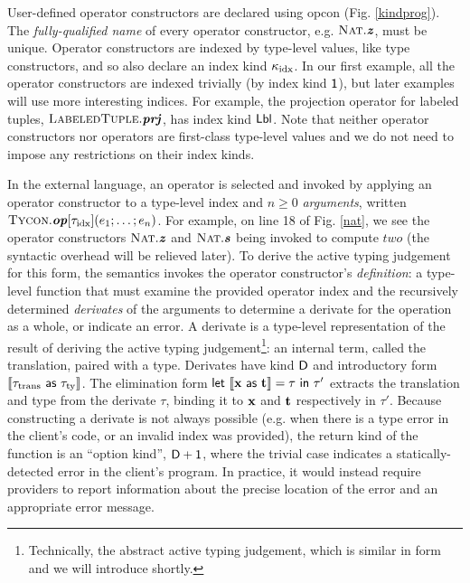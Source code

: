 \documentclass[9pt,preprint]{sigplanconf}
\begin{document}
User-defined operator constructors are declared using \textsf{opcon} (Fig. \ref{kindprog}). The \emph{fully-qualified name} of every operator constructor, e.g. $\textsc{Nat}.\textbf{\textit{z}}$, must be unique. Operator constructors are indexed by type-level values, like type constructors, and so also declare an index kind $\kappa_{\text{idx}}$. In our first example, all the operator constructors are indexed trivially (by index kind $\textsf{1}$), but later examples will use more interesting indices. For example, the projection operator for labeled tuples, $\textsc{LabeledTuple}.\textbf{\textit{prj}}$, has index kind $\textsf{Lbl}$. 
Note that neither operator constructors nor operators are first-class type-level values and we do not need to impose any restrictions on their index kinds.

In the external language, an operator is selected and invoked by applying an operator constructor to a type-level index and $n \geq 0$ \emph{arguments}, written ${\textsc{Tycon}.\textbf{\textit{op}}[{\tau_{\text{idx}}}](e_{1};\ldots;e_{n})}$. For example, on line 18 of Fig. \ref{nat}, we see the operator constructors $\textsc{Nat}.\textbf{\textit{z}}$ and $\textsc{Nat}.\textbf{\textit{s}}$ being invoked to compute $two$ (the syntactic overhead will be relieved later). %
To derive the active typing judgement for this form, the semantics invokes  
 the operator constructor's  \emph{definition}: a type-level function that must examine the provided operator index and the recursively determined \emph{derivates} of the arguments to determine a derivate for the operation as a whole,  or indicate an error. A derivate is a type-level representation of the result of deriving the active typing judgement\footnote{Technically, the abstract active typing judgement, which is similar in form and we will introduce shortly.}: an internal term, called the {translation},  paired with a type. Derivates have kind $\textsf{D}$ and introductory form $\llbracket {\tau_{\text{trans}}}~{\sf as}~{\tau_{\text{ty}}} \rrbracket$. The elimination form ${\sf let}~\llbracket {\textbf{x}}~{\sf as}~{\textbf{t}} \rrbracket=\tau~{\sf in}~\tau'$ extracts the translation and type from the derivate $\tau$, binding it to ${\textbf{x}}$ and ${\textbf{t}}$ respectively in $\tau'$. 
Because constructing a derivate is not always possible (e.g. when there is a type error in the client's code, or an invalid index was provided), the return kind of the function is an ``option kind'', $\textsf{D} + \textsf{1}$, where the trivial case indicates a statically-detected error in the client's program. In practice, it would instead require providers to report information about the precise location of the error and an appropriate error message.
 
\end{document}
